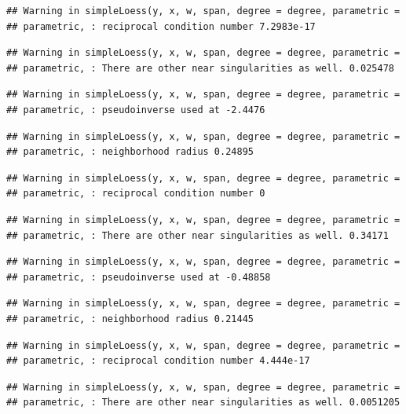 \documentclass[]{article}
\begin{document}
\begin{verbatim}
## Warning in simpleLoess(y, x, w, span, degree = degree, parametric =
## parametric, : reciprocal condition number 7.2983e-17
\end{verbatim}

\begin{verbatim}
## Warning in simpleLoess(y, x, w, span, degree = degree, parametric =
## parametric, : There are other near singularities as well. 0.025478
\end{verbatim}

\begin{verbatim}
## Warning in simpleLoess(y, x, w, span, degree = degree, parametric =
## parametric, : pseudoinverse used at -2.4476
\end{verbatim}

\begin{verbatim}
## Warning in simpleLoess(y, x, w, span, degree = degree, parametric =
## parametric, : neighborhood radius 0.24895
\end{verbatim}

\begin{verbatim}
## Warning in simpleLoess(y, x, w, span, degree = degree, parametric =
## parametric, : reciprocal condition number 0
\end{verbatim}

\begin{verbatim}
## Warning in simpleLoess(y, x, w, span, degree = degree, parametric =
## parametric, : There are other near singularities as well. 0.34171
\end{verbatim}

\begin{verbatim}
## Warning in simpleLoess(y, x, w, span, degree = degree, parametric =
## parametric, : pseudoinverse used at -0.48858
\end{verbatim}

\begin{verbatim}
## Warning in simpleLoess(y, x, w, span, degree = degree, parametric =
## parametric, : neighborhood radius 0.21445
\end{verbatim}

\begin{verbatim}
## Warning in simpleLoess(y, x, w, span, degree = degree, parametric =
## parametric, : reciprocal condition number 4.444e-17
\end{verbatim}

\begin{verbatim}
## Warning in simpleLoess(y, x, w, span, degree = degree, parametric =
## parametric, : There are other near singularities as well. 0.0051205
\end{verbatim}
\end{document}
